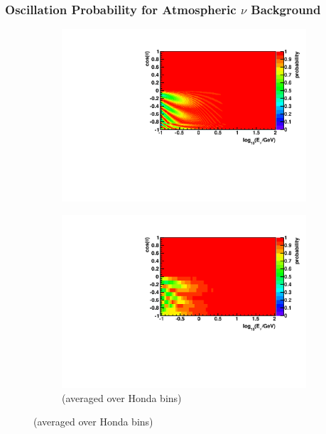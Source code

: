 \documentclass{beamer}
\begin{document}
\begin{frame}
	\frametitle{Oscillation Probability for Atmospheric $\nu$ Background}
	\begin{figure}
		\begin{subfigure}[]{0.45\linewidth}
			\centering
			\vspace{-15pt}
			\caption*{ $\overline{\nu}_{e} \rightarrow \overline{\nu}_{e}$ }
			\vspace{-8pt}
			\includegraphics[width=\linewidth]{atm_nuebar2nuebar.pdf} \\
			\vspace{-10pt}
			\caption*{(averaged over Honda bins)}
			\vspace{-8pt}
			\includegraphics[width=\linewidth]{atm_nuebar2nuebar_avg.pdf}
		\end{subfigure}

\end{figure}
\end{frame}
\end{document}
